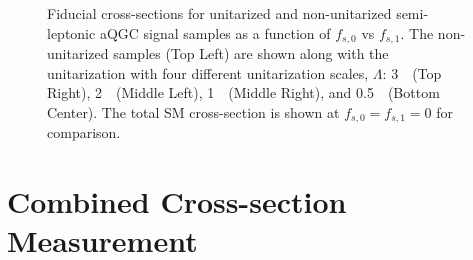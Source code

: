 \begin{figure}[ht]
\caption{Fiducial cross-sections for unitarized and non-unitarized semi-leptonic 
aQGC signal samples as a function of $f_{s,0}$ vs $f_{s,1}$.
The non-unitarized samples (Top Left) are shown along with the unitarization with 
four different unitarization scales, $\Lambda$: 3~\TeV~(Top Right),
2~\TeV~(Middle Left), 1~\TeV~(Middle Right), and 0.5~\TeV~(Bottom Center).
The total SM cross-section is shown at $f_{s,0}=f_{s,1}=0$ for comparison.}
\label{fig:2l2j_aqgc_fiducial_xsec}
\end{figure}


\section{Combined Cross-section Measurement}
\label{sec:combined_measurement}

